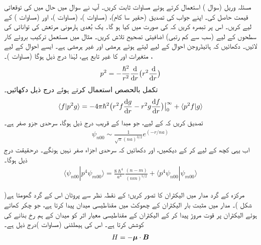  
مسئلہ وریل (سوال ) استعمال کرتے ہوئے مساوات  ثابت کریں۔ 
آپ نے سوال  میں حال  میں  کی توقعاتی قیمت حاصل کی۔ اپنے جواب کی تصدیق  (حقیر سا کام)،  (مساوات )،  (مساوات )، اور  (مساوات ) کے لیے کریں۔ اس پر تبصرہ کریں کہ  کی صورت میں کیا ہو گا۔
 یک بُعدی ہارمونی مرتعش کی توانائی کی سطحوں کے لیے (سب سے کم رتبی) اضافیتی تصحیح تلاش کریں۔ مثال  میں مستعمل ترکیب بروئے کار لائیں۔ 
دکھائیں کہ ہائیڈروجن احوال کے لیے  لیتے ہوئے  ہرمشی اور  غیر ہرمشی ہے۔ ایسے احوال کے لیے ، متغیرات  اور  کا غیر تابع ہے، لہٰذا درج ذیل ہوگا (مساوات )۔
\begin{align*}
p^2 = - \frac{\hslash^2}{r^2} \frac{\dif }{\dif r} \big ( r^2 \frac{\dif}{\dif r} \big )
\end{align*}
تکمل بالحصص استعمال کرتے ہوئے درج ذیل دکھائیں۔
\begin{align*}
\langle f | p^2 g \rangle = - 4 \pi \hslash^2 
\big ( r^2 f \frac{\dif g}{\dif r} - r^2 g \frac{\dif f}{\dif r} \big ) \big \rvert_0^{\infty} + \langle p^2 f | g \rangle 
\end{align*}
تصدیق کریں کہ  کے لیے، جو مبدا کے قریب درج ذیل ہوگا، سرحدی جزو صفر ہے۔
\begin{align*}
\psi_{n00} \sim \frac{1}{\sqrt{\pi} (na)^{3/2}} e^{(-r/na)}
\end{align*}
اب یہی کچھ  کے لیے کر کے دیکھیں، اور دکھائیں کہ سرحدی اجزاء صفر نہیں ہونگے۔ درحقیقت درج ذیل ہوگا۔
\begin{align*}
\langle \psi_{n00} | p^4 \psi_{m00} \rangle = \frac{8\hslash^4}{a^4} \frac{(n - m)}{(nm)^{5/2}} + \langle p^4 \psi_{n00} | \psi_{m00} \rangle
\end{align*}


مرکزہ کے گرد مدار میں الیکٹران کا تصور کریں؛  کے نقطہ نظر سے پروٹان اس کے گرد گھومتا ہے( شکل )۔ مدار میں مثبت بار الیکٹران کے چھوکٹ میں مقناطیسی میدان  پیدا کرتا ہے، جو چکر کھاتے ہوئے الیکٹران پر قوت مروڑ پیدا کر کے الیکٹران کے مقناطیسی معیار اثر  کو میدان کے ہم رخ بنانے کی کوشش کرتا ہے۔ اس کی ہیملٹنی (مساوات )درج ذیل ہے۔
\begin{align}\label{مساوات_غیر_مضطرب_مقناطیسی_میدان_میں_ہیملٹنی}
H = - {{\boldsymbol{\mu}}} \cdot {\ensuremath{{\boldsymbol{B}}}}
\end{align}

